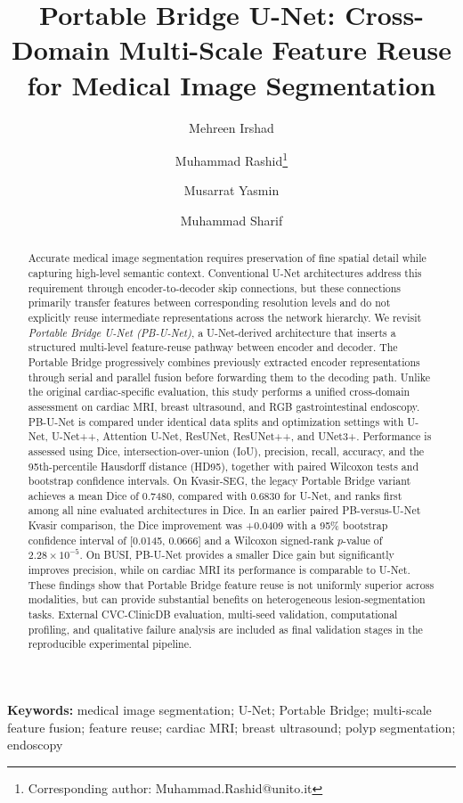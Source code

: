\documentclass[11pt]{article}
\title{Portable Bridge U-Net: Cross-Domain Multi-Scale Feature Reuse for Medical Image Segmentation}
\author[1]{Mehreen Irshad}
\author[2]{Muhammad Rashid\thanks{Corresponding author: Muhammad.Rashid@unito.it}}
\author[1]{Musarrat Yasmin}
\author[1]{Muhammad Sharif}
\affil[1]{Department of Computer Science, COMSATS University Islamabad, Wah Campus, Pakistan}
\affil[2]{Department of Computer Science, University of Turin, 10149 Turin, Italy}
\date{}
\begin{document}
\maketitle

\begin{abstract}
Accurate medical image segmentation requires preservation of fine spatial detail while capturing high-level semantic context. Conventional U-Net architectures address this requirement through encoder-to-decoder skip connections, but these connections primarily transfer features between corresponding resolution levels and do not explicitly reuse intermediate representations across the network hierarchy. We revisit \emph{Portable Bridge U-Net (PB-U-Net)}, a U-Net-derived architecture that inserts a structured multi-level feature-reuse pathway between encoder and decoder. The Portable Bridge progressively combines previously extracted encoder representations through serial and parallel fusion before forwarding them to the decoding path. Unlike the original cardiac-specific evaluation, this study performs a unified cross-domain assessment on cardiac MRI, breast ultrasound, and RGB gastrointestinal endoscopy. PB-U-Net is compared under identical data splits and optimization settings with U-Net, U-Net++, Attention U-Net, ResUNet, ResUNet++, and UNet3+. Performance is assessed using Dice, intersection-over-union (IoU), precision, recall, accuracy, and the 95th-percentile Hausdorff distance (HD95), together with paired Wilcoxon tests and bootstrap confidence intervals. On Kvasir-SEG, the legacy Portable Bridge variant achieves a mean Dice of 0.7480, compared with 0.6830 for U-Net, and ranks first among all nine evaluated architectures in Dice. In an earlier paired PB-versus-U-Net Kvasir comparison, the Dice improvement was +0.0409 with a 95\% bootstrap confidence interval of [0.0145, 0.0666] and a Wilcoxon signed-rank $p$-value of $2.28\times10^{-5}$. On BUSI, PB-U-Net provides a smaller Dice gain but significantly improves precision, while on cardiac MRI its performance is comparable to U-Net. These findings show that Portable Bridge feature reuse is not uniformly superior across modalities, but can provide substantial benefits on heterogeneous lesion-segmentation tasks. External CVC-ClinicDB evaluation, multi-seed validation, computational profiling, and qualitative failure analysis are included as final validation stages in the reproducible experimental pipeline.
\end{abstract}

\noindent\textbf{Keywords:} medical image segmentation; U-Net; Portable Bridge; multi-scale feature fusion; feature reuse; cardiac MRI; breast ultrasound; polyp segmentation; endoscopy
\end{document}
